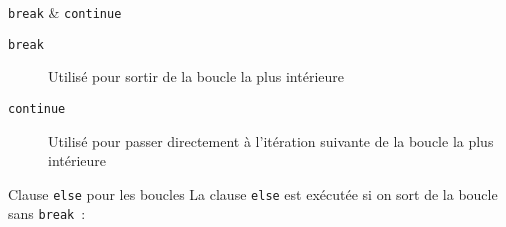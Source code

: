 \begin{frame}{\texttt{break} \& \texttt{continue}}
  \begin{description}
    \item[\texttt{break}] Utilisé pour sortir de la boucle la plus intérieure
    \item[\texttt{continue}] Utilisé pour passer directement à l'itération suivante de la boucle la plus intérieure
  \end{description}

\end{frame}

\begin{frame}{Clause \texttt{else} pour les boucles}
  La clause \texttt{else} est exécutée si on sort de la boucle sans \texttt{break}~:

\end{frame}

